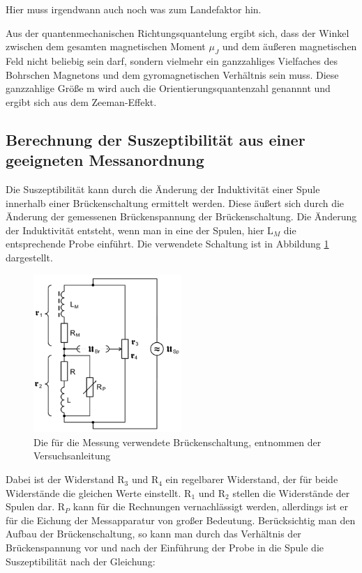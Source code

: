 Hier muss irgendwann auch noch was zum Landefaktor hin.

Aus der quantenmechanischen Richtungsquantelung ergibt sich, dass der Winkel zwischen dem gesamten magnetischen Moment $\mu_J$ und dem äußeren magnetischen Feld nicht beliebig sein darf, sondern vielmehr ein ganzzahliges Vielfaches des Bohrschen Magnetons und dem gyromagnetischen Verhältnis sein muss.
Diese ganzzahlige Größe m wird auch die Orientierungsquantenzahl genannnt und ergibt sich aus dem Zeeman-Effekt.

\subsection{Berechnung der Suszeptibilität aus einer geeigneten Messanordnung}

Die Suszeptibilität kann durch die Änderung der Induktivität einer Spule innerhalb einer Brückenschaltung ermittelt werden.
Diese äußert sich durch die Änderung der gemessenen Brückenspannung der Brückenschaltung.
Die Änderung der Induktivität entsteht, wenn man in eine der Spulen, hier L$_M$ die entsprechende Probe einführt.
Die verwendete Schaltung ist in Abbildung \ref{fig:Brückenschaltung} dargestellt.

\begin{figure}
  \centering
  \includegraphics[width=0.5\textwidth]{images/Brueckenschaltung.png}
  \caption{Die für die Messung verwendete Brückenschaltung, entnommen der Versuchsanleitung\cite[179]{sample}}
  \label{fig:Brückenschaltung}
\end{figure}

Dabei ist der Widerstand R$_3$ und R$_4$ ein regelbarer Widerstand, der für beide Widerstände die gleichen Werte einstellt.
R$_1$ und R$_2$ stellen die Widerstände der Spulen dar.
R$_P$ kann für die Rechnungen vernachlässigt werden, allerdings ist er für die Eichung der Messapparatur von großer Bedeutung.
Berücksichtig man den Aufbau der Brückenschaltung, so kann man durch das Verhältnis der Brückenspannung vor und nach der Einführung der Probe in die Spule die Suszeptibilität nach der Gleichung:

